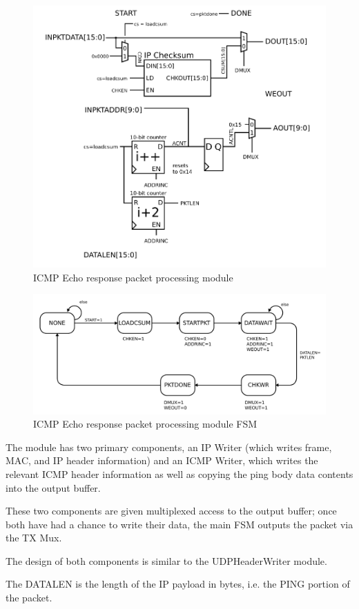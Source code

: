 \begin{figure}
\begin{centering}
\includegraphics[scale=0.8]{pingicmpwriter.svg}
\end{centering}
\caption{ICMP Echo response packet processing module}
\label{ping}
\end{figure}

\begin{figure}
\begin{centering}
\includegraphics[scale=0.8]{pingicmpwriter.fsm.svg}
\end{centering}
\caption{ICMP Echo response packet processing module FSM}
\label{ping.fsm}
\end{figure}

The module has two primary components, an IP Writer (which writes
frame, MAC, and IP header information) and an ICMP Writer, which
writes the relevant ICMP header information as well as copying the
ping body data contents into the output buffer.

These two components are given multiplexed access to the output
buffer; once both have had a chance to write their data, the main FSM
outputs the packet via the TX Mux.

The design of both components is similar to the UDPHeaderWriter module. 

The DATALEN is the length of the IP payload in bytes, i.e. the PING portion of the packet. 
